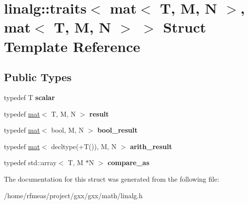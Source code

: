 \hypertarget{structlinalg_1_1traits_3_01mat_3_01T_00_01M_00_01N_01_4_00_01mat_3_01T_00_01M_00_01N_01_4_01_4}{}\section{linalg\+:\+:traits$<$ mat$<$ T, M, N $>$, mat$<$ T, M, N $>$ $>$ Struct Template Reference}
\label{structlinalg_1_1traits_3_01mat_3_01T_00_01M_00_01N_01_4_00_01mat_3_01T_00_01M_00_01N_01_4_01_4}
\subsection*{Public Types}
\begin{DoxyCompactItemize}
\item 
typedef T {\bfseries scalar}\hypertarget{structlinalg_1_1traits_3_01mat_3_01T_00_01M_00_01N_01_4_00_01mat_3_01T_00_01M_00_01N_01_4_01_4_a74a934d5a94437f5c8e88339ded3e378}{}\label{structlinalg_1_1traits_3_01mat_3_01T_00_01M_00_01N_01_4_00_01mat_3_01T_00_01M_00_01N_01_4_01_4_a74a934d5a94437f5c8e88339ded3e378}

\item 
typedef \hyperlink{structlinalg_1_1mat}{mat}$<$ T, M, N $>$ {\bfseries result}\hypertarget{structlinalg_1_1traits_3_01mat_3_01T_00_01M_00_01N_01_4_00_01mat_3_01T_00_01M_00_01N_01_4_01_4_a2b9561fb69457877ddb9d55c75ce4397}{}\label{structlinalg_1_1traits_3_01mat_3_01T_00_01M_00_01N_01_4_00_01mat_3_01T_00_01M_00_01N_01_4_01_4_a2b9561fb69457877ddb9d55c75ce4397}

\item 
typedef \hyperlink{structlinalg_1_1mat}{mat}$<$ bool, M, N $>$ {\bfseries bool\+\_\+result}\hypertarget{structlinalg_1_1traits_3_01mat_3_01T_00_01M_00_01N_01_4_00_01mat_3_01T_00_01M_00_01N_01_4_01_4_ad631200a2b37ebea27070bd990d6f470}{}\label{structlinalg_1_1traits_3_01mat_3_01T_00_01M_00_01N_01_4_00_01mat_3_01T_00_01M_00_01N_01_4_01_4_ad631200a2b37ebea27070bd990d6f470}

\item 
typedef \hyperlink{structlinalg_1_1mat}{mat}$<$ decltype(+T()), M, N $>$ {\bfseries arith\+\_\+result}\hypertarget{structlinalg_1_1traits_3_01mat_3_01T_00_01M_00_01N_01_4_00_01mat_3_01T_00_01M_00_01N_01_4_01_4_acb5bac1e94282939edaff14cc72100b3}{}\label{structlinalg_1_1traits_3_01mat_3_01T_00_01M_00_01N_01_4_00_01mat_3_01T_00_01M_00_01N_01_4_01_4_acb5bac1e94282939edaff14cc72100b3}

\item 
typedef std\+::array$<$ T, M $\ast$N $>$ {\bfseries compare\+\_\+as}\hypertarget{structlinalg_1_1traits_3_01mat_3_01T_00_01M_00_01N_01_4_00_01mat_3_01T_00_01M_00_01N_01_4_01_4_a3cb8e3ebd72fdfa37a434933bda5f86d}{}\label{structlinalg_1_1traits_3_01mat_3_01T_00_01M_00_01N_01_4_00_01mat_3_01T_00_01M_00_01N_01_4_01_4_a3cb8e3ebd72fdfa37a434933bda5f86d}

\end{DoxyCompactItemize}


The documentation for this struct was generated from the following file\+:\begin{DoxyCompactItemize}
\item 
/home/rfmeas/project/gxx/gxx/math/linalg.\+h\end{DoxyCompactItemize}
